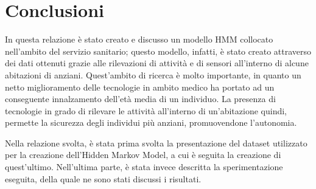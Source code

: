 \documentclass[10pt,a4paper]{article}
\begin{document}
	
	\clearpage
	\section{Conclusioni}
	
	In questa relazione è stato creato e discusso un modello HMM collocato nell'ambito del servizio sanitario; questo modello, infatti, è stato creato attraverso dei dati ottenuti grazie alle rilevazioni di attività e di sensori all'interno di alcune abitazioni di anziani. Quest'ambito di ricerca è molto importante, in quanto un netto miglioramento delle tecnologie in ambito medico ha portato ad un conseguente innalzamento dell'età media di un individuo. La presenza di tecnologie in grado di rilevare le attività all'interno di un'abitazione quindi, permette la sicurezza degli individui più anziani, promuovendone l'autonomia.
	
	Nella relazione svolta, è stata prima svolta la presentazione del dataset utilizzato per la creazione dell'Hidden Markov Model, a cui è seguita la creazione di quest'ultimo.
	Nell'ultima parte, è stata invece descritta la sperimentazione eseguita, della quale ne sono stati discussi i risultati.
\end{document}

